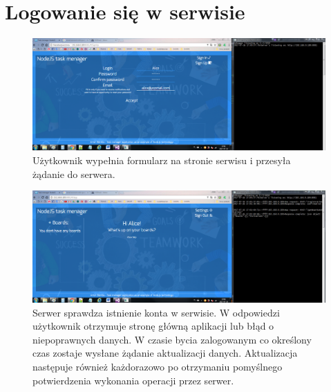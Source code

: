 \documentclass[12pt]{report}
\begin{document}
\section{Logowanie się w serwisie}
\begin{figure}[!hb]
\centering
\includegraphics[width=\textwidth,height=\textheight,keepaspectratio]{41.png}
\captionsetup{labelformat=empty}
\caption[]{Użytkownik wypełnia formularz na stronie serwisu i przesyła żądanie do serwera.}
\end{figure}
\begin{figure}[!hb]
\centering
\includegraphics[width=\textwidth,height=\textheight,keepaspectratio]{42.png}
\captionsetup{labelformat=empty}
\caption[]{Serwer sprawdza istnienie konta w serwisie. 
W odpowiedzi użytkownik otrzymuje stronę główną aplikacji lub błąd o niepoprawnych danych.
W czasie bycia zalogowanym co określony czas zostaje wysłane żądanie aktualizacji danych. 
Aktualizacja następuje również każdorazowo po otrzymaniu pomyślnego potwierdzenia wykonania operacji przez serwer.}
\end{figure}
\end{document}
